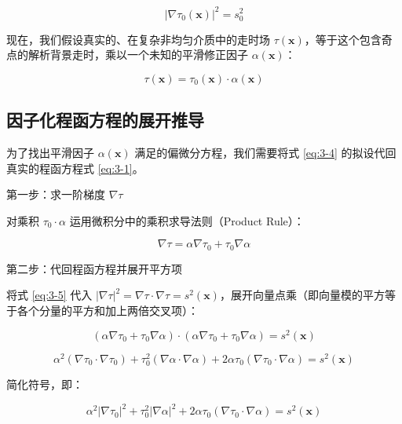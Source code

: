 \documentclass[12pt]{article}
\begin{document}
{\begin{equation}
|\nabla \tau_0(\mathbf{x})|^2 = s_0^2
\label{eq:3-3}
\end{equation}

现在，我们假设真实的、在复杂非均匀介质中的走时场 $\tau(\mathbf{x})$，等于这个包含奇点的解析背景走时，乘以一个未知的平滑修正因子 $\alpha(\mathbf{x})$：

\begin{equation}
\tau(\mathbf{x}) = \tau_0(\mathbf{x}) \cdot \alpha(\mathbf{x})
\label{eq:3-4}
\end{equation}

\subsection{因子化程函方程的展开推导}

为了找出平滑因子 $\alpha(\mathbf{x})$ 满足的偏微分方程，我们需要将式 \eqref{eq:3-4} 的拟设代回真实的程函方程式 \eqref{eq:3-1}。

第一步：求一阶梯度 $\nabla \tau$

对乘积 $\tau_0 \cdot \alpha$ 运用微积分中的乘积求导法则（Product Rule）：

\begin{equation}
\nabla \tau = \alpha \nabla \tau_0 + \tau_0 \nabla \alpha
\label{eq:3-5}
\end{equation}

第二步：代回程函方程并展开平方项

将式 \eqref{eq:3-5} 代入 $|\nabla \tau|^2 = \nabla \tau \cdot \nabla \tau = s^2(\mathbf{x})$，展开向量点乘（即向量模的平方等于各个分量的平方和加上两倍交叉项）：

\begin{equation}
(\alpha \nabla \tau_0 + \tau_0 \nabla \alpha) \cdot (\alpha \nabla \tau_0 + \tau_0 \nabla \alpha) = s^2(\mathbf{x})
\label{eq:3-5-expand}
\end{equation}

\begin{equation}
\alpha^2 (\nabla \tau_0 \cdot \nabla \tau_0) + \tau_0^2 (\nabla \alpha \cdot \nabla \alpha) + 2 \alpha \tau_0 (\nabla \tau_0 \cdot \nabla \alpha) = s^2(\mathbf{x})
\label{eq:3-5-expand-2}
\end{equation}

简化符号，即：

\begin{equation}
\alpha^2 |\nabla \tau_0|^2 + \tau_0^2 |\nabla \alpha|^2 + 2 \alpha \tau_0 (\nabla \tau_0 \cdot \nabla \alpha) = s^2(\mathbf{x})
\label{eq:3-6}
\end{equation}

}
\end{document}
